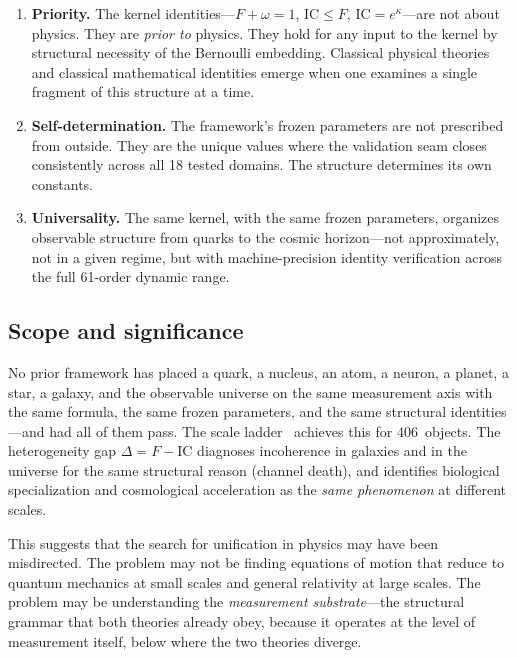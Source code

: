 \documentclass[
  aps,
  prd,
  twocolumn,
  superscriptaddress,
  nofootinbib,
  floatfix
]{revtex4-2}
\newcommand{\IC}{\mathrm{IC}}
\begin{document}
\begin{enumerate}[leftmargin=*,label=(\roman*)]
\item \textbf{Priority.}  The kernel identities---$F + \omega = 1$,
  $\IC \leq F$, $\IC = e^\kappa$---are not about physics.  They are
  \emph{prior to} physics.  They hold for any input to the kernel by
  structural necessity of the Bernoulli embedding.  Classical physical
  theories and classical mathematical identities emerge when one
  examines a single fragment of this structure at a time.

\item \textbf{Self-determination.}  The framework's frozen parameters
  are not prescribed from outside.  They are the unique values where
  the validation seam closes consistently across all 18 tested
  domains.  The structure determines its own constants.

\item \textbf{Universality.}  The same kernel, with the same frozen
  parameters, organizes observable structure from quarks to the cosmic
  horizon---not approximately, not in a given regime, but with
  machine-precision identity verification across the full 61-order
  dynamic range.
\end{enumerate}

\subsection{Scope and significance}

No prior framework has placed a quark, a nucleus, an atom, a neuron,
a planet, a star, a galaxy, and the observable universe on the same
measurement axis with the same formula, the same frozen parameters,
and the same structural identities---and had all of them pass.  The
scale ladder~\cite{umcpmetadatarepo} achieves this for 406~objects.
The heterogeneity gap $\Delta = F - \IC$ diagnoses incoherence in
galaxies and in the universe for the same structural reason (channel
death), and identifies biological specialization and cosmological
acceleration as the \emph{same phenomenon} at different scales.

This suggests that the search for unification in physics may have
been misdirected.  The problem may not be finding equations of motion
that reduce to quantum mechanics at small scales and general
relativity at large scales.  The problem may be understanding the
\emph{measurement substrate}---the structural grammar that both
theories already obey, because it operates at the level of
measurement itself, below where the two theories diverge.
\end{document}
